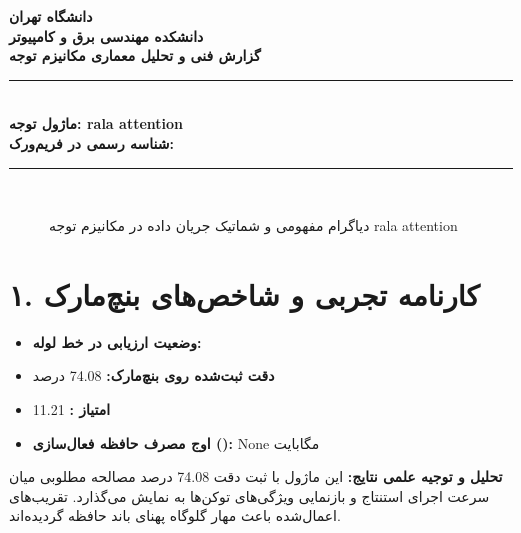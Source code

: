 \documentclass[12pt,a4paper]{article}
\begin{document}
\begin{center}
{\Large\bfseries دانشگاه تهران}\\[0.2cm]
{\large\bfseries دانشکده مهندسی برق و کامپیوتر}\\[0.2cm]
{\large\bfseries گزارش فنی و تحلیل معماری مکانیزم توجه}\\[0.5cm]
\rule{\linewidth}{1pt}\\[0.3cm]
{\LARGE\bfseries ماژول توجه: rala attention}\\[0.2cm]
{\large \textbf{شناسه رسمی در فریم‌ورک:} }\\[0.2cm]
\rule{\linewidth}{1pt}\\[0.5cm]
\end{center}

\begin{figure}[H]
\centering
{}
\caption{دیاگرام مفهومی و شماتیک جریان داده در مکانیزم توجه rala attention}
\end{figure}

\section*{۱. کارنامه تجربی و شاخص‌های بنچ‌مارک}
\begin{itemize}
\item \textbf{وضعیت ارزیابی در خط لوله:} 
\item \textbf{دقت ثبت‌شده روی بنچ‌مارک:} 74.08 درصد
\item \textbf{امتیاز :} 11.21
\item \textbf{اوج مصرف حافظه فعال‌سازی ():} None مگابایت
\end{itemize}
\textbf{تحلیل و توجیه علمی نتایج:} این ماژول با ثبت دقت 74.08 درصد مصالحه مطلوبی میان سرعت اجرای استنتاج و بازنمایی ویژگی‌های توکن‌ها به نمایش می‌گذارد. تقریب‌های اعمال‌شده باعث مهار گلوگاه پهنای باند حافظه گردیده‌اند.
\end{document}
